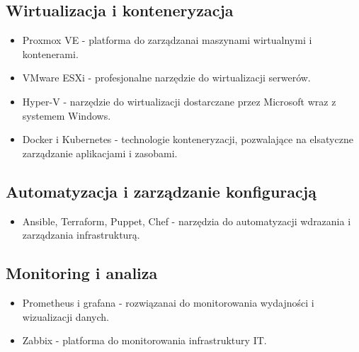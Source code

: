 \subsection{Wirtualizacja i konteneryzacja}
\begin{itemize}
    \item Proxmox VE - platforma do zarządzanai maszynami wirtualnymi i kontenerami.
    \item VMware ESXi - profesjonalne narzędzie do wirtualizacji serwerów.
    \item Hyper-V - narzędzie do wirtualizacji dostarczane przez Microsoft wraz z systemem Windows.
    \item Docker i Kubernetes - technologie konteneryzacji, pozwalające na elsatyczne zarządzanie aplikacjami i zasobami.
\end{itemize}

\subsection{Automatyzacja i zarządzanie konfiguracją}

\begin{itemize}
    \item Ansible, Terraform, Puppet, Chef - narzędzia do automatyzacji wdrazania i zarządzania infrastrukturą.
\end{itemize}

\subsection{Monitoring i analiza}
\begin{itemize}
    \item Prometheus i grafana - rozwiązanai do monitorowania wydajności i wizualizacji danych.
    \item Zabbix - platforma do monitorowania infrastruktury IT.
\end{itemize}
